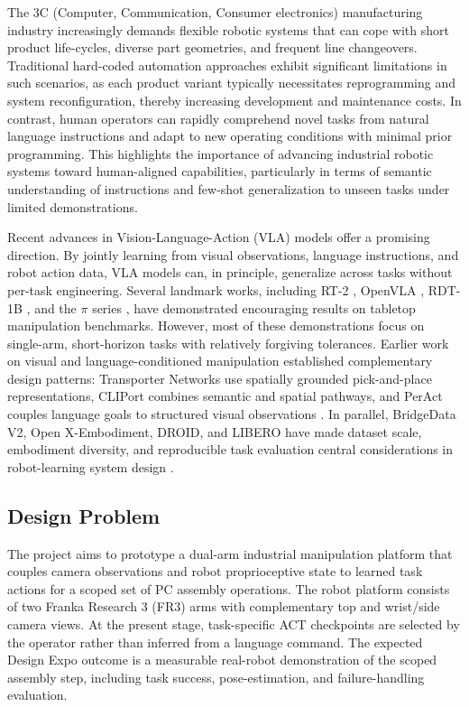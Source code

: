 \documentclass[12pt, letterpaper]{article}
\newcommand{\drone}[1]{{\color{gray}#1}}
\begin{document}
\drone{The 3C (Computer, Communication, Consumer electronics) manufacturing industry increasingly demands flexible robotic systems that can cope with short product life-cycles, diverse part geometries, and frequent line changeovers. Traditional hard-coded automation approaches exhibit significant limitations in such scenarios, as each product variant typically necessitates reprogramming and system reconfiguration, thereby increasing development and maintenance costs. In contrast, human operators can rapidly comprehend novel tasks from natural language instructions and adapt to new operating conditions with minimal prior programming. This highlights the importance of advancing industrial robotic systems toward human-aligned capabilities, particularly in terms of semantic understanding of instructions and few-shot generalization to unseen tasks under limited demonstrations.}

\drone{Recent advances in Vision-Language-Action (VLA) models offer a promising direction. By jointly learning from visual observations, language instructions, and robot action data, VLA models can, in principle, generalize across tasks without per-task engineering. Several landmark works, including RT-2 \cite{rt2}, OpenVLA \cite{openvla}, RDT-1B \cite{rdt1b}, and the $\pi$ series \cite{pi0}, have demonstrated encouraging results on tabletop manipulation benchmarks. However, most of these demonstrations focus on single-arm, short-horizon tasks with relatively forgiving tolerances.}
Earlier work on visual and language-conditioned manipulation established complementary design patterns: Transporter Networks use spatially grounded pick-and-place representations, CLIPort combines semantic and spatial pathways, and PerAct couples language goals to structured visual observations \cite{transporter,cliport,peract}. In parallel, BridgeData V2, Open X-Embodiment, DROID, and LIBERO have made dataset scale, embodiment diversity, and reproducible task evaluation central considerations in robot-learning system design \cite{bridgev2,openx,droid,libero}.

\subsection{Design Problem}

The project aims to prototype a dual-arm industrial manipulation platform that couples camera observations and robot proprioceptive state to learned task actions for a scoped set of PC assembly operations. The robot platform consists of two Franka Research 3 (FR3) arms with complementary top and wrist/side camera views. At the present stage, task-specific ACT checkpoints are selected by the operator rather than inferred from a language command. The expected Design Expo outcome is a measurable real-robot demonstration of the scoped assembly step, including task success, pose-estimation, and failure-handling evaluation.
\end{document}
